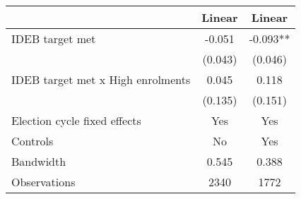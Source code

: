 \begin{tabular}{lcc}
  \toprule
  & Linear & Linear \\ 
  \midrule
IDEB target met & -0.051 & -0.093** \\ 
   & (0.043) & (0.046) \\ 
  IDEB target met x High enrolments & 0.045 & 0.118 \\ 
   & (0.135) & (0.151) \\ 
  Election cycle fixed effects & Yes & Yes \\ 
  Controls & No & Yes \\ 
  Bandwidth & 0.545 & 0.388 \\ 
  Observations & 2340 & 1772 \\ 
   \bottomrule
\end{tabular}

